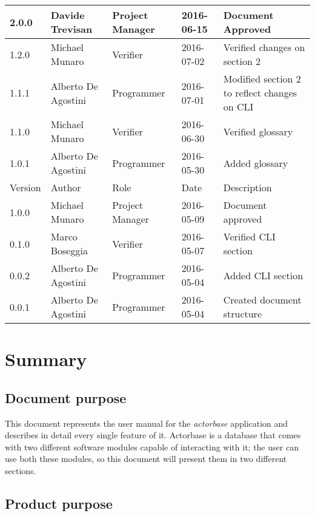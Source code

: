 \documentclass{scalatekids-article}
\begin{document}
\begin{center}
  \begin{longtable}{| l | l | l | l | p{5cm} |}
    \hline
    2.0.0 & Davide Trevisan & Project Manager & 2016-06-15 & Document Approved\\
    \hline
    1.2.0 & Michael Munaro & Verifier & 2016-07-02 & Verified changes on section 2\\
    \hline
    1.1.1 & Alberto De Agostini & Programmer & 2016-07-01 & Modified section 2 to reflect changes on CLI\\
    \hline
    1.1.0 & Michael Munaro & Verifier & 2016-06-30 & Verified glossary\\
    \hline
    1.0.1 & Alberto De Agostini & Programmer & 2016-05-30 & Added glossary\\
    \hline
    Version & Author & Role & Date & Description \\
    \hline
    1.0.0 & Michael Munaro & Project Manager & 2016-05-09 & Document approved\\
    \hline
    0.1.0 & Marco Boseggia & Verifier & 2016-05-07 & Verified CLI section\\
    \hline
    0.0.2 & Alberto De Agostini & Programmer & 2016-05-04 & Added CLI section\\
    \hline
    0.0.1 & Alberto De Agostini & Programmer & 2016-05-04 & Created document structure\\
    \hline
  \end{longtable}
\end{center}
\tableofcontents
\newpage
{}
\section{Summary}

\subsection{Document purpose}
This document represents the user manual for the \textit{actorbase} application
and describes in detail every single feature of it. Actorbase is a database that
comes with two different software modules capable of interacting with it; the
user can use both these modules, so this document will present them in two
different sections.

\subsection{Product purpose}
\end{document}
